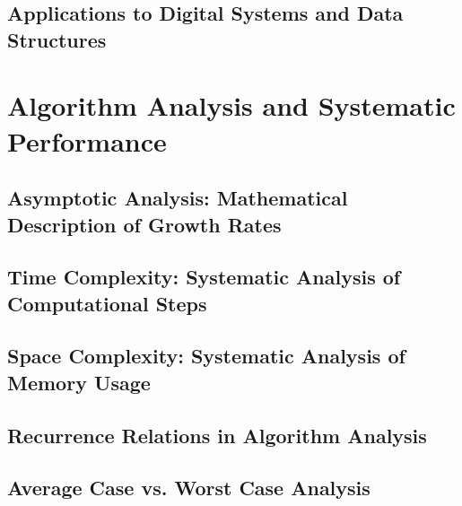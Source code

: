 \documentclass[12pt, oneside, openany]{book}
\begin{document}
\section{Applications to Digital Systems and Data Structures}


\chapter{Algorithm Analysis and Systematic Performance}

\section{Asymptotic Analysis: Mathematical Description of Growth Rates}

\section{Time Complexity: Systematic Analysis of Computational Steps}

\section{Space Complexity: Systematic Analysis of Memory Usage}

\section{Recurrence Relations in Algorithm Analysis}

\section{Average Case vs. Worst Case Analysis}
\end{document}
